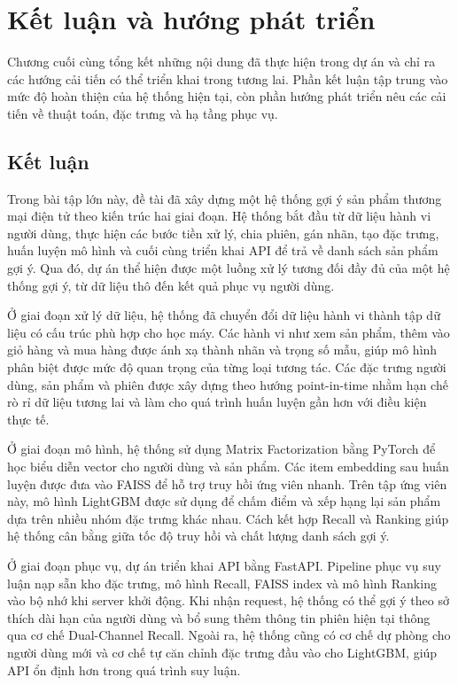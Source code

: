 ﻿\chapter{Kết luận và hướng phát triển}

Chương cuối cùng tổng kết những nội dung đã thực hiện trong dự án và chỉ ra các hướng cải tiến có thể triển khai trong tương lai. Phần kết luận tập trung vào mức độ hoàn thiện của hệ thống hiện tại, còn phần hướng phát triển nêu các cải tiến về thuật toán, đặc trưng và hạ tầng phục vụ.

\section{Kết luận}
Trong bài tập lớn này, đề tài đã xây dựng một hệ thống gợi ý sản phẩm thương mại điện tử theo kiến trúc hai giai đoạn. Hệ thống bắt đầu từ dữ liệu hành vi người dùng, thực hiện các bước tiền xử lý, chia phiên, gán nhãn, tạo đặc trưng, huấn luyện mô hình và cuối cùng triển khai API để trả về danh sách sản phẩm gợi ý. Qua đó, dự án thể hiện được một luồng xử lý tương đối đầy đủ của một hệ thống gợi ý, từ dữ liệu thô đến kết quả phục vụ người dùng.
\medskip

Ở giai đoạn xử lý dữ liệu, hệ thống đã chuyển đổi dữ liệu hành vi thành tập dữ liệu có cấu trúc phù hợp cho học máy. Các hành vi như xem sản phẩm, thêm vào giỏ hàng và mua hàng được ánh xạ thành nhãn và trọng số mẫu, giúp mô hình phân biệt được mức độ quan trọng của từng loại tương tác. Các đặc trưng người dùng, sản phẩm và phiên được xây dựng theo hướng point-in-time nhằm hạn chế rò rỉ dữ liệu tương lai và làm cho quá trình huấn luyện gần hơn với điều kiện thực tế.
\medskip

Ở giai đoạn mô hình, hệ thống sử dụng Matrix Factorization bằng PyTorch để học biểu diễn vector cho người dùng và sản phẩm. Các item embedding sau huấn luyện được đưa vào FAISS để hỗ trợ truy hồi ứng viên nhanh. Trên tập ứng viên này, mô hình LightGBM được sử dụng để chấm điểm và xếp hạng lại sản phẩm dựa trên nhiều nhóm đặc trưng khác nhau. Cách kết hợp Recall và Ranking giúp hệ thống cân bằng giữa tốc độ truy hồi và chất lượng danh sách gợi ý.
\medskip

Ở giai đoạn phục vụ, dự án triển khai API bằng FastAPI. Pipeline phục vụ suy luận nạp sẵn kho đặc trưng, mô hình Recall, FAISS index và mô hình Ranking vào bộ nhớ khi server khởi động. Khi nhận request, hệ thống có thể gợi ý theo sở thích dài hạn của người dùng và bổ sung thêm thông tin phiên hiện tại thông qua cơ chế Dual-Channel Recall. Ngoài ra, hệ thống cũng có cơ chế dự phòng cho người dùng mới và cơ chế tự căn chỉnh đặc trưng đầu vào cho LightGBM, giúp API ổn định hơn trong quá trình suy luận.
\medskip

